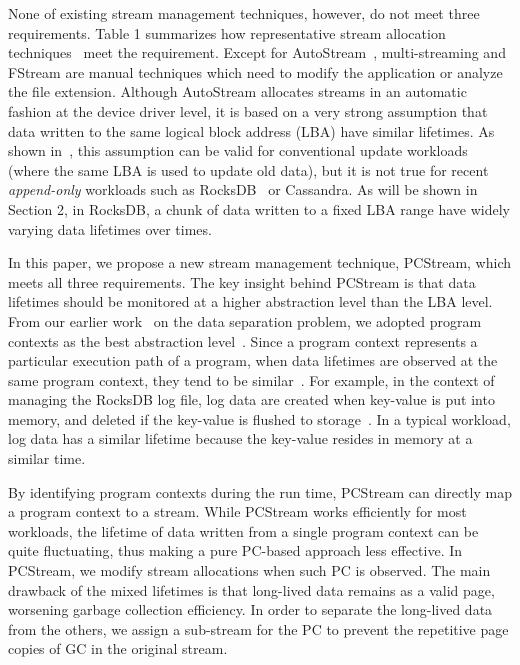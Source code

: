 None of existing stream management techniques, however, do not meet three requirements.  
Table 1 summarizes how representative stream allocation
techniques~\cite{MultiStream,FStream,AutoStream} meet the requirement.   
Except for AutoStream~\cite{AutoStream}, multi-streaming and FStream are manual techniques 
which need to modify the application or analyze the file extension.
Although AutoStream allocates streams in an automatic fashion at the device driver level, 
it is based on a very strong assumption that data written to the same logical block 
address (LBA) have similar lifetimes.   
As shown in~\cite{PCHa}, this assumption can be valid for conventional update workloads 
(where the same LBA is used to update old data), but it is not true for
recent {\it append-only} workloads such as RocksDB~\cite{RocksDB} or Cassandra.  
As will be shown in Section 2, in RocksDB, a chunk of data written to a fixed 
LBA range have widely varying data lifetimes over times.  

In this paper, we propose a new stream management technique, PCStream, which meets all three requirements.   
The key insight behind PCStream is that
data lifetimes should be monitored at a higher abstraction level than the LBA level.   
From our earlier work~\cite{PCHa} on the data separation problem, we
adopted program contexts as the best abstraction level~\cite{PC}. 
Since a program context represents a particular execution path of a program, 
when data lifetimes are observed at the same program context, 
they tend to be similar~\cite{PCHa}. 
For example, in the context of managing the RocksDB log file, 
log data are created when key-value is put into memory, 
and deleted if the key-value is flushed to storage~\cite{RocksDB}.
In a typical workload, log data has a similar lifetime because the key-value resides in memory at a similar time.

By identifying program contexts during the run time, 
PCStream can directly map a program context to a stream.   
While PCStream works efficiently for most workloads, the lifetime of data written from
a single program context can be quite fluctuating, thus making a pure PC-based approach less effective.   
In PCStream, we modify stream allocations when such PC is observed. 
The main drawback of the mixed lifetimes is that 
long-lived data remains as a valid page, worsening garbage collection efficiency.
In order to separate the long-lived data from the others,
we assign a sub-stream for the PC to prevent the repetitive page copies of GC in the original stream.

